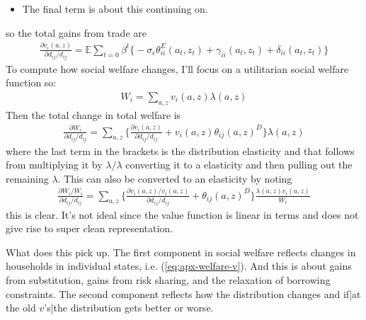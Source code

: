 \documentclass[12pt,pdftex]{article}
\begin{document}
\begin{onehalfspacing}
\begin{itemize}
\item The final term is about this continuing on.
\end{itemize}
so the total gains from trade are
\begin{align}
\frac{\partial v_i(a, z)}{\partial d_{ij} / d_{ij}} = \mathbb{E} \sum_{t = 0} \beta^{t} \bigg \{ -\sigma_{\epsilon} \theta^{E}_{ii}(a_{t},z_{t}) + \gamma_{ii}(a_{t},z_{t}) + \delta_{ii}(a_{t},z_{t}) \bigg \}
\label{eq:apx-welfare-v}
\end{align}
To compute how social welfare changes, I'll focus on a utilitarian social welfare function so:
\begin{align}
W_{i} = \sum_{a,z} v_{i}(a,z)\lambda(a,z)
\end{align}
Then the total change in total welfare is
\begin{align}
\frac{\partial W_{i}}{\partial d_{ij} / d_{ij}} = \sum_{a,z} \bigg \{ \frac{\partial v_i(a, z)}{\partial d_{ij} / d_{ij}}  + v_{i}(a,z) \theta_{ij}(a,z)^{D} \bigg \} \lambda(a,z)
\end{align}
where the last term in the brackets is the distribution elasticity and that follows from multiplying it by $\lambda / \lambda$ converting it to a elasticity and then pulling out the remaining $\lambda$. This can also be converted to an elasticity by noting
\begin{align}
\frac{\partial W_{i} / W_{i}}{\partial d_{ij} / d_{ij}} = \sum_{a,z} \bigg \{ \frac{\partial v_i(a, z) / v_{i}(a, z)}{\partial d_{ij} / d_{ij}}  +  \theta_{ij}(a,z)^{D} \bigg \} \frac{\lambda(a,z)v_{i}(a,z)}{W_{i}}
\label{eq:apx-social-welfare}
\end{align}
this is clear. It's not ideal since the value function is linear in terms and does not give rise to super clean representation.

What does this pick up. The first component in social welfare reflects changes in households in individual states, i.e. (\ref{eq:apx-welfare-v}). And this is about gains from substitution, gains from risk sharing, and the relaxation of borrowing constraints. The second component reflects how the distribution changes and if|at the old $v$'s|the distribution gets better or worse.


\end{onehalfspacing}
\end{document}
